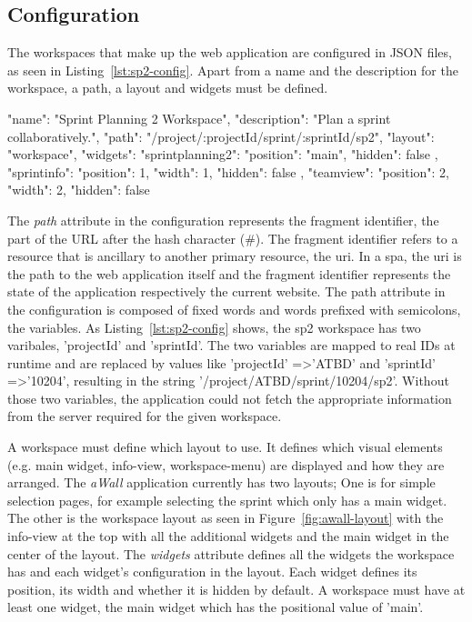 \documentclass{sigchi}
\begin{document}
\newpage
\subsection{Configuration}

The workspaces that make up the web application are configured in JSON files, as seen in Listing~\ref{lst:sp2-config}. 
Apart from a name and the description for the workspace, a path, a layout and widgets must be defined. 


\begin{code}[caption={Configuration for the \gls{sp2} workspace.},label=lst:sp2-config]
{
  "name": "Sprint Planning 2 Workspace",
  "description": "Plan a sprint collaboratively.",
  "path": "/project/:projectId/sprint/:sprintId/sp2",
  "layout": "workspace",
  "widgets": {
    "sprintplanning2": {
      "position": "main",
      "hidden": false
    },
    "sprintinfo": {
      "position": 1,
      "width": 1,
      "hidden": false
    },
    "teamview": {
      "position": 2,
      "width": 2,
      "hidden": false
    }
  }
}
\end{code}


The \textit{path} attribute in the configuration represents the fragment identifier, the part of the URL after the hash character (\#).
The fragment identifier refers to a resource that is ancillary to another primary resource, the \gls{uri}.
In a \gls{spa}, the \gls{uri} is the path to the web application itself and the fragment identifier represents the state of the application respectively the current website.
The path attribute in the configuration is composed of fixed words and words prefixed with semicolons, the variables.
As Listing~\ref{lst:sp2-config} shows, the \gls{sp2} workspace has two varibales, 'projectId' and 'sprintId'.
The two variables are mapped to real IDs at runtime and are replaced by values like 'projectId' =\textgreater 'ATBD' and 'sprintId' =\textgreater '10204', resulting in the string '/project/ATBD/sprint/10204/sp2'.
Without those two variables, the application could not fetch the appropriate information from the server required for the given workspace.

A workspace must define which layout to use.
It defines which visual elements (e.g. main widget, info-view, workspace-menu) are displayed and how they are arranged.
The \textit{aWall} application currently has two layouts; One is for simple selection pages, for example selecting the sprint which only has a main widget.
The other is the workspace layout as seen in Figure~\ref{fig:awall-layout} with the info-view at the top with all the additional widgets and the main widget in the center of the layout.
The \textit{widgets} attribute defines all the widgets the workspace has and each widget's configuration in the layout.
Each widget defines its position, its width and whether it is hidden by default.
A workspace must have at least one widget, the main widget which has the positional value of 'main'.
\end{document}
